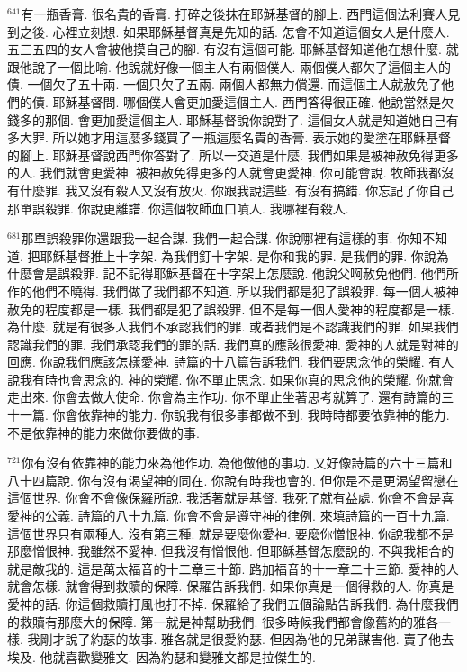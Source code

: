 \documentclass{book}
\begin{document}
$^{641}$有一瓶香膏.
很名貴的香膏.
打碎之後抹在耶穌基督的腳上.
西門這個法利賽人見到之後.
心裡立刻想.
如果耶穌基督真是先知的話.
怎會不知道這個女人是什麼人.
五三五四的女人會被他摸自己的腳.
有沒有這個可能.
耶穌基督知道他在想什麼.
就跟他說了一個比喻.
他說就好像一個主人有兩個僕人.
兩個僕人都欠了這個主人的債.
一個欠了五十兩.
一個只欠了五兩.
兩個人都無力償還.
而這個主人就赦免了他們的債.
耶穌基督問.
哪個僕人會更加愛這個主人.
西門答得很正確.
他說當然是欠錢多的那個.
會更加愛這個主人.
耶穌基督說你說對了.
這個女人就是知道她自己有多大罪.
所以她才用這麼多錢買了一瓶這麼名貴的香膏.
表示她的愛塗在耶穌基督的腳上.
耶穌基督說西門你答對了.
所以一交道是什麼.
我們如果是被神赦免得更多的人.
我們就會更愛神.
被神赦免得更多的人就會更愛神.
你可能會說.
牧師我都沒有什麼罪.
我又沒有殺人又沒有放火.
你跟我說這些.
有沒有搞錯.
你忘記了你自己那單誤殺罪.
你說更離譜.
你這個牧師血口噴人.
我哪裡有殺人.

$^{681}$那單誤殺罪你還跟我一起合謀.
我們一起合謀.
你說哪裡有這樣的事.
你知不知道.
把耶穌基督推上十字架.
為我們釘十字架.
是你和我的罪.
是我們的罪.
你說為什麼會是誤殺罪.
記不記得耶穌基督在十字架上怎麼說.
他說父啊赦免他們.
他們所作的他們不曉得.
我們做了我們都不知道.
所以我們都是犯了誤殺罪.
每一個人被神赦免的程度都是一樣.
我們都是犯了誤殺罪.
但不是每一個人愛神的程度都是一樣.
為什麼.
就是有很多人我們不承認我們的罪.
或者我們是不認識我們的罪.
如果我們認識我們的罪.
我們承認我們的罪的話.
我們真的應該很愛神.
愛神的人就是對神的回應.
你說我們應該怎樣愛神.
詩篇的十八篇告訴我們.
我們要思念他的榮耀.
有人說我有時也會思念的.
神的榮耀.
你不單止思念.
如果你真的思念他的榮耀.
你就會走出來.
你會去做大使命.
你會為主作功.
你不單止坐著思考就算了.
還有詩篇的三十一篇.
你會依靠神的能力.
你說我有很多事都做不到.
我時時都要依靠神的能力.
不是依靠神的能力來做你要做的事.

$^{721}$你有沒有依靠神的能力來為他作功.
為他做他的事功.
又好像詩篇的六十三篇和八十四篇說.
你有沒有渴望神的同在.
你說有時我也會的.
但你是不是更渴望留戀在這個世界.
你會不會像保羅所說.
我活著就是基督.
我死了就有益處.
你會不會是喜愛神的公義.
詩篇的八十九篇.
你會不會是遵守神的律例.
來填詩篇的一百十九篇.
這個世界只有兩種人.
沒有第三種.
就是要麼你愛神.
要麼你憎恨神.
你說我都不是那麼憎恨神.
我雖然不愛神.
但我沒有憎恨他.
但耶穌基督怎麼說的.
不與我相合的就是敵我的.
這是萬太福音的十二章三十節.
路加福音的十一章二十三節.
愛神的人就會怎樣.
就會得到救贖的保障.
保羅告訴我們.
如果你真是一個得救的人.
你真是愛神的話.
你這個救贖打風也打不掉.
保羅給了我們五個論點告訴我們.
為什麼我們的救贖有那麼大的保障.
第一就是神幫助我們.
很多時候我們都會像舊約的雅各一樣.
我剛才說了約瑟的故事.
雅各就是很愛約瑟.
但因為他的兄弟謀害他.
賣了他去埃及.
他就喜歡變雅文.
因為約瑟和變雅文都是拉傑生的.
\end{document}

